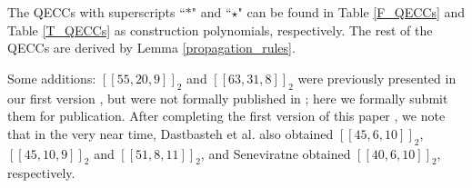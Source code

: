 \documentclass[journal]{IEEEtran}
\begin{document}
\begin{table}[!t]
\begin{threeparttable}
\begin{tablenotes}
			\item[1] The QECCs with superscripts ``$*$" and ``$\star$" can be found in Table \ref{F_QECCs} and Table \ref{T_QECCs} as construction polynomials, respectively. The rest of the QECCs are derived by Lemma \ref{propagation_rules}.          %
			\item[2] Some additions: 
			$[[55,20,9]]_2$ and $[[63,31,8]]_2$ were previously presented in our first version \cite{guan2021new}, but were not formally published in \cite{guan2022new}; here we formally submit them for publication.
			After completing the first version of this paper \cite{guan2022symplectic}, we note that in the very near time, Dastbasteh et al. \cite{dastbasteh2023polynomial} also obtained $[[45,6,10]]_2$, $[[45,10,9]]_2$ and $[[51,8,11]]_2$, and Seneviratne \cite{Grassltable} obtained $[[40,6,10]]_2$, respectively.
		\end{tablenotes}            %
	\end{threeparttable}       %
\end{table}
\end{document}

